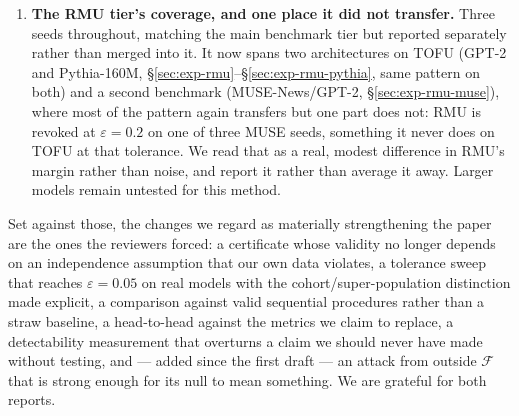 \documentclass[11pt,a4paper]{article}
\newcommand{\eps}{\varepsilon}
\newcommand{\F}{\mathcal{F}}
\begin{document}
\begin{enumerate}[leftmargin=1.4em,itemsep=3pt]
$17\to18$ issued), and one cell (TOFU/GPT-2 RMU seed~1) is genuinely order-sensitive and
is flagged as such. The tables remain as originally computed; a deployed audit should
use the beacon.
\item \textbf{The RMU tier's coverage, and one place it did not transfer.} Three seeds
throughout, matching the main benchmark tier but reported separately rather than
merged into it. It now spans two architectures on TOFU (GPT-2 and Pythia-160M,
\S\ref{sec:exp-rmu}--\S\ref{sec:exp-rmu-pythia}, same pattern on both) and a second benchmark
(MUSE-News/GPT-2, \S\ref{sec:exp-rmu-muse}), where most of the pattern again transfers but one
part does not: RMU is revoked at $\eps=0.2$ on one of three MUSE seeds, something it
never does on TOFU at that tolerance. We read that as a real, modest difference in
RMU's margin rather than noise, and report it rather than average it away. Larger
models remain untested for this method.
\end{enumerate}

\noindent Set against those, the changes we regard as materially strengthening the
paper are the ones the reviewers forced: a certificate whose validity no longer depends
on an independence assumption that our own data violates, a tolerance sweep that reaches
$\eps=0.05$ on real models with the cohort/super-population distinction made explicit, a
comparison against valid sequential procedures rather than a straw baseline, a
head-to-head against the metrics we claim to replace, a detectability measurement
that overturns a claim we should never have made without testing, and --- added since
the first draft --- an attack from outside $\F$ that is strong enough for its null to
mean something. We are grateful for both reports.



\end{document}
